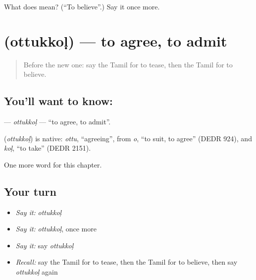 \begin{tcolorbox}[breakable,colback=teal!4,colframe=teal!35!black,title={Before you move on}]
What does  mean? (\textquotedblleft{}To believe\textquotedblright{}.) Say it once more.
\end{tcolorbox}
\section[\texorpdfstring{\ta{ஒத்துக்கொள்} (ottukkoḷ)}{ஒத்துக்கொள் (ottukkoḷ)}]{ (ottukkoḷ) — to agree, to admit}

\label{lesson:TA-C199-ottukkol}



\begin{quote}
Before the new one: say the Tamil for to tease, then the Tamil for to believe.
\end{quote}

\subsection*{You'll want to know: }
\textbf{} — \emph{ottukkoḷ} — \textquotedblleft{}to agree, to admit\textquotedblright{}.

\begin{cousinweb}
\textbf{} (\emph{ottukkoḷ}) is native: \emph{ottu}, \textquotedblleft{}agreeing\textquotedblright{}, from \emph{o}, \textquotedblleft{}to suit, to agree\textquotedblright{} (DEDR 924), and \emph{koḷ}, \textquotedblleft{}to take\textquotedblright{} (DEDR 2151).
\end{cousinweb}

\begin{grammarlens}[title={What you've built}]
One more word for this chapter.
\end{grammarlens}

\subsection*{Your turn}
\begin{itemize}
\raggedright
  \item \emph{Say it:} \emph{ottukkoḷ}
  \item \emph{Say it:} \emph{ottukkoḷ}, once more
  \item \emph{Say it:} say \emph{ottukkoḷ}
  \item \emph{Recall:} say the Tamil for to tease, then the Tamil for to believe, then say \emph{ottukkoḷ} again
\end{itemize}

